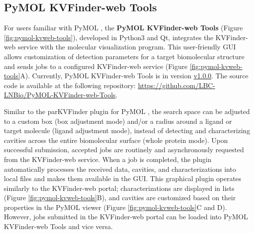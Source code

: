 \documentclass[Ingles]{phdthesis}
\begin{document}
\subsection{PyMOL KVFinder-web Tools}

For users familiar with PyMOL \cite{pymol}, the \textbf{PyMOL KVFinder-web Tools} (Figure \ref{fig:pymol-kvweb-tools}), developed in Python3 and Qt, integrates the KVFinder-web service with the molecular visualization program. This user-friendly \acs{GUI} allows customization of detection parameters for a target biomolecular structure and sends jobs to a configured KVFinder-web service (Figure \ref{fig:pymol-kvweb-tools}A). Currently, PyMOL KVFinder-web Tools is in version \href{https://github.com/LBC-LNBio/PyMOL-KVFinder-web-Tools/releases/tag/v1.0.0}{v1.0.0}. The source code is available at the following repository: \url{https://github.com/LBC-LNBio/PyMOL-KVFinder-web-Tools}.

Similar to the parKVFinder plugin for PyMOL \cite{guerra2020}, the search space can be adjusted to a custom box (box adjustment mode) and/or a radius around a ligand or target molecule (ligand adjustment mode), instead of detecting and characterizing cavities across the entire biomolecular surface (whole protein mode). Upon successful submission, accepted jobs are routinely and asynchronously requested from the KVFinder-web service. When a job is completed, the plugin automatically processes the received data, cavities, and characterizations into local files and makes them available in the GUI. This graphical plugin operates similarly to the KVFinder-web portal; characterizations are displayed in lists (Figure \ref{fig:pymol-kvweb-tools}B), and cavities are customized based on their properties in the PyMOL viewer (Figure \ref{fig:pymol-kvweb-tools}C and D). However, jobs submitted in the KVFinder-web portal can be loaded into PyMOL KVFinder-web Tools and vice versa.
\end{document}
